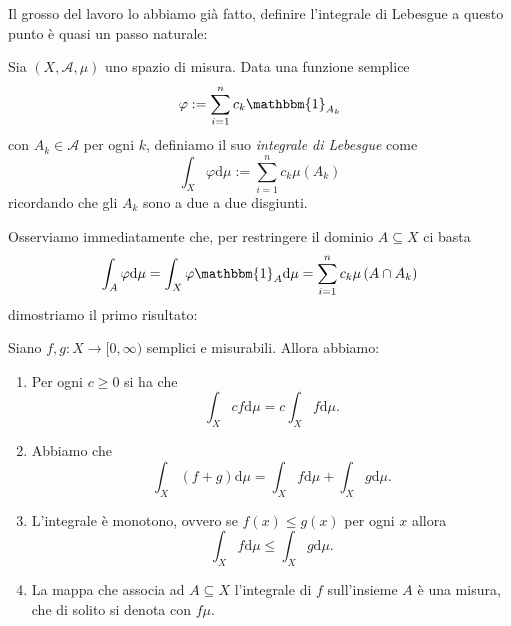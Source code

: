 \documentclass[11pt]{scrartcl}
\newcommand{\dif}{\text{d}}
\begin{document}
	Il grosso del lavoro lo abbiamo già fatto, definire l'integrale di Lebesgue a questo punto è quasi un passo naturale:
	\begin{definition}
		Sia $(X,\mathcal{A},\mu)$ uno spazio di misura. Data una funzione semplice 
		$$\varphi:=\sum_{i=1}^{n}c_k\mathbbm{1}_{A_k}$$
		con $A_k\in \mathcal{A}$ per ogni $k$, definiamo il suo \textit{integrale di Lebesgue} come
		$$\int_X\varphi \dif \mu := \sum_{i=1}^{n}c_k\mu\left(A_k\right)$$
		ricordando che gli $A_k$ sono a due a due disgiunti. 
	\end{definition}
	Osserviamo immediatamente che, per restringere il dominio $A\subseteq X$ ci basta
	$$\int_A \varphi \dif \mu = \int_X \varphi \mathbbm{1}_A\dif \mu=\sum_{i=1}^{n}c_k\mu\left(A\cap A_k\right)$$
	dimostriamo il primo risultato:
	\begin{lemma}
		Siano $f,g:X\to [0,\infty)$ semplici e misurabili. Allora abbiamo:
		\begin{enumerate}
			\item Per ogni $c\ge 0$ si ha che 
			$$\int_Xcf\dif \mu = c\int_Xf\dif \mu.$$
			\item Abbiamo che 
			$$\int_X \left(f+g\right)\dif \mu =\int_X f\dif \mu + \int_X g\dif \mu.$$
			\item L'integrale è monotono, ovvero se $f(x)\le g(x)$ per ogni $x$ allora
			$$\int_X f \dif \mu \le \int_X g \dif \mu.$$
			\item La mappa che associa ad $A\subseteq X$ l'integrale di $f$ sull'insieme $A$ è una misura, che di solito si denota con $f\mu$. 
		\end{enumerate}
	\end{lemma}
\end{document}
